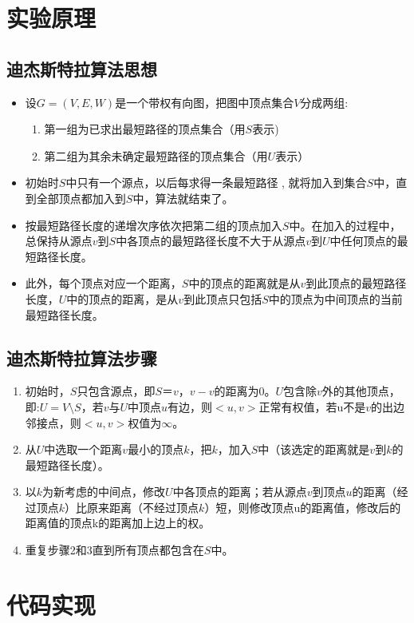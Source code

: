 \documentclass[a4paper,10pt]{ctexart}
\begin{document}
\section{实验原理}
\subsection{迪杰斯特拉算法思想}
\begin{itemize}
\item 设$G=(V,E,W)$是一个带权有向图，把图中顶点集合$V$分成两组:
    \begin{enumerate}
    \item 第一组为已求出最短路径的顶点集合（用$S$表示)
    \item 第二组为其余未确定最短路径的顶点集合（用$U$表示）
    \end{enumerate}
\item 初始时$S$中只有一个源点，以后每求得一条最短路径 , 就将加入到集合$S$中，直到全部顶点都加入到$S$中，算法就结束了。
\item 按最短路径长度的递增次序依次把第二组的顶点加入$S$中。在加入的过程中，总保持从源点$v$到$S$中各顶点的最短路径长度不大于从源点$v$到$U$中任何顶点的最短路径长度。
\item 此外，每个顶点对应一个距离，$S$中的顶点的距离就是从$v$到此顶点的最短路径长度，$U$中的顶点的距离，是从$v$到此顶点只包括$S$中的顶点为中间顶点的当前最短路径长度。
\end{itemize}
\subsection{迪杰斯特拉算法步骤}
\begin{enumerate}
  \item 初始时，$S$只包含源点，即$S＝{v}$，$v-v$的距离为0。$U$包含除$v$外的其他顶点，即:$U=V \setminus S$，若$v$与$U$中顶点$u$有边，则$<u,v>$正常有权值，若u不是$v$的出边邻接点，则$<u,v>$权值为$ \infty $。
  \item 从$U$中选取一个距离$v$最小的顶点$k$，把$k$，加入$S$中（该选定的距离就是$v$到$k$的最短路径长度）。
  \item 以$k$为新考虑的中间点，修改$U$中各顶点的距离；若从源点$v$到顶点$u$的距离（经过顶点$k$）比原来距离（不经过顶点$k$）短，则修改顶点u的距离值，修改后的距离值的顶点k的距离加上边上的权。
  \item 重复步骤2和3直到所有顶点都包含在$S$中。
\end{enumerate}

\section{代码实现}
\end{document}
